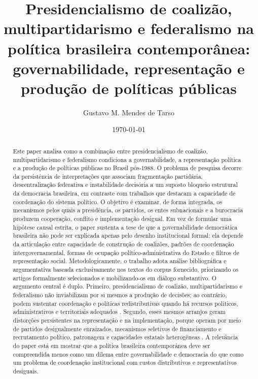 \documentclass[12pt,a4paper]{article}
\author{Gustavo M. Mendes de Tarso}
\date{\today}
\title{Presidencialismo de coalizão, multipartidarismo e federalismo na política brasileira contemporânea: governabilidade, representação e produção de políticas públicas}
\begin{document}
\makemytitle

\begin{abstract}
Este paper analisa como a combinação entre presidencialismo de coalizão, multipartidarismo e federalismo condiciona a governabilidade, a representação política e a produção de políticas públicas no Brasil pós-1988. O problema de pesquisa decorre da persistência de interpretações que associam fragmentação partidária, descentralização federativa e instabilidade decisória a um suposto bloqueio estrutural da democracia brasileira, em contraste com trabalhos que destacam a capacidade de coordenação do sistema político. O objetivo é examinar, de forma integrada, os mecanismos pelos quais a presidência, os partidos, os entes subnacionais e a burocracia produzem cooperação, conflito e implementação desigual. Em vez de formular uma hipótese causal estrita, o paper sustenta a tese de que a governabilidade democrática brasileira não pode ser explicada apenas pelo desenho institucional formal: ela depende da articulação entre capacidade de construção de coalizões, padrões de coordenação intergovernamental, formas de ocupação político-administrativa do Estado e filtros de representação social. Metodologicamente, o trabalho adota análise bibliográfica e argumentativa baseada exclusivamente nos textos do corpus fornecido, priorizando os artigos formalmente selecionados e mobilizando-os em diálogo substantivo. O argumento central é duplo. Primeiro, presidencialismo de coalizão, multipartidarismo e federalismo não inviabilizam por si mesmos a produção de decisões; ao contrário, podem sustentar coordenação e políticas redistributivas quando há recursos políticos, administrativos e territoriais adequados \parencite{limongi2017_a_crise,palermo2000_como_se,arretche2018_democracia_e,oliveira2019_momentos_da}. Segundo, esses mesmos arranjos geram distorções persistentes na representação e na implementação, porque operam por meio de partidos desigualmente enraizados, mecanismos seletivos de financiamento e recrutamento político, patronagem e capacidades estatais heterogêneas \parencite{campos2017_o_que,sacchet2018_why_gender,gatto2025_resistance_to,panizza2022_the_politics,mcdonnell2020_patchwork_leviathan}. A relevância do paper está em mostrar que a política brasileira contemporânea deve ser compreendida menos como um dilema entre governabilidade e democracia do que como um problema de coordenação institucional com custos distributivos e representativos desiguais.
\end{abstract}
\end{document}

